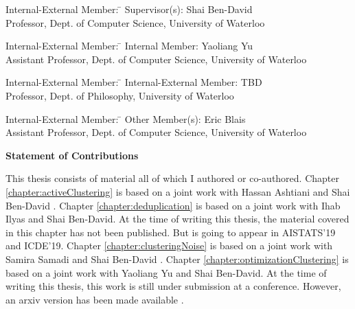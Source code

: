 \documentclass[letterpaper,12pt,titlepage,oneside,final]{book}
\let\origdoublepage\cleardoublepage
\newcommand{\clearemptydoublepage}{%
  \clearpage{\pagestyle{empty}\origdoublepage}}
\let\cleardoublepage\clearemptydoublepage
\begin{document}
  \noindent
\begin{tabbing}
Internal-External Member: \=  \kill %
Supervisor(s): \> Shai Ben-David \\
\> Professor, Dept. of Computer Science, University of Waterloo \\
\end{tabbing}
  \bigskip
  
  \noindent
  \begin{tabbing}
Internal-External Member: \=  \kill %
Internal Member: \> Yaoliang Yu \\
\> Assistant Professor, Dept. of Computer Science, University of Waterloo \\
\end{tabbing}
  \bigskip
  
  \noindent
\begin{tabbing}
Internal-External Member: \=  \kill %
Internal-External Member: \> TBD \\
\> Professor, Dept. of Philosophy, University of Waterloo \\
\end{tabbing}
  \bigskip
  
  \noindent
\begin{tabbing}
Internal-External Member: \=  \kill %
Other Member(s): \> Eric Blais \\
\> Assistant Professor, Dept. of Computer Science, University of Waterloo \\
\end{tabbing}

\cleardoublepage

\begin{center}\textbf{Statement of Contributions}\end{center}
  \noindent
This thesis consists of material all of which I authored or co-authored. Chapter \ref{chapter:activeClustering} is based on a joint work with Hassan Ashtiani and Shai Ben-David \cite{ashtiani2016clustering}. Chapter \ref{chapter:deduplication} is based on a joint work with Ihab Ilyas and Shai Ben-David. At the time of writing this thesis, the material covered in this chapter has not been published. But is going to appear in AISTATS'19 and ICDE'19. Chapter \ref{chapter:clusteringNoise} is based on a joint work with Samira Samadi and Shai Ben-David \cite{kushagra2016finding}. Chapter \ref{chapter:optimizationClustering} is based on a joint work with Yaoliang Yu and Shai Ben-David. At the time of writing this thesis, this work is still under submission at a conference. However, an arxiv version has been made available \cite{kushagra2017provably}. 
\end{document}
